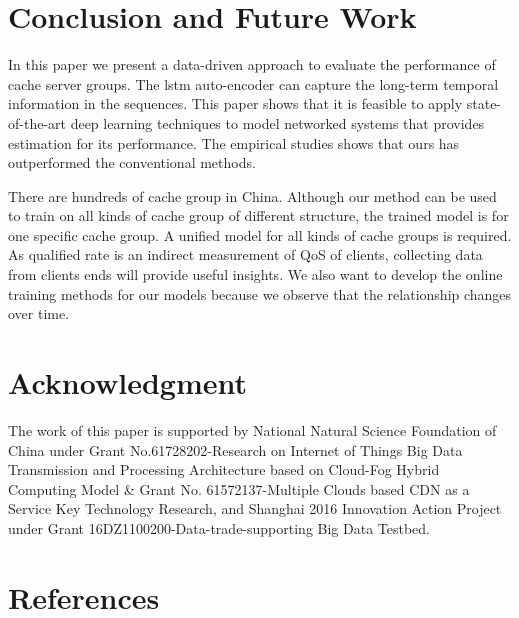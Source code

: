\documentclass[5p]{elsarticle}
\begin{document}
\section{Conclusion and Future Work}

In this paper we present a data-driven approach to evaluate the performance of cache server groups. The lstm auto-encoder can capture the long-term temporal information in the sequences. This paper shows that it is feasible to apply state-of-the-art deep learning techniques to model networked systems that provides estimation for its performance. The empirical studies shows that ours has outperformed the conventional methods.

There are hundreds of cache group in China. Although our method can be used to train on all kinds of cache group of different structure, the trained model is for one specific cache group. A unified model for all kinds of cache groups is required. As qualified rate is an indirect measurement of QoS of clients, collecting data from clients ends will provide useful insights. We also want to develop the online training methods for our models because we observe that the relationship changes over time.

\section{Acknowledgment}
The work of this paper is supported by National Natural Science Foundation of China under Grant No.61728202-Research on Internet of Things Big Data Transmission and Processing Architecture based on Cloud-Fog Hybrid Computing Model & Grant No. 61572137-Multiple Clouds based CDN as a Service Key Technology Research, and Shanghai 2016 Innovation Action Project under Grant 16DZ1100200-Data-trade-supporting Big Data Testbed.


\section*{References}


\end{document}
